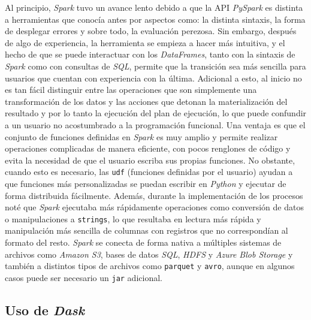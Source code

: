Al principio, \textit{Spark} tuvo un avance lento debido a que la API \textit{PySpark} es distinta a herramientas que conocía antes por aspectos como: la distinta sintaxis, la forma de desplegar errores y sobre todo, la evaluación perezosa. Sin embargo, después de algo de experiencia, la herramienta se empieza a hacer más intuitiva, y el hecho de que se puede interactuar con los \textit{DataFrames}, tanto con la sintaxis de \textit{Spark} como con consultas de \textit{SQL}, permite que la transición sea más sencilla para usuarios que cuentan con experiencia con la última. Adicional a esto, al inicio no es tan fácil distinguir entre las operaciones que son simplemente una transformación de los datos y las acciones que detonan la materialización del resultado y por lo tanto la ejecución del plan de ejecución, lo que puede confundir a un usuario no acostumbrado a la programación funcional. 
Una ventaja es que el conjunto de funciones definidas en \textit{Spark} es muy amplio y permite realizar operaciones complicadas de manera eficiente, con pocos renglones de código y evita la necesidad de que el usuario escriba sus propias funciones. No obstante, cuando esto es necesario, las \texttt{udf} (funciones definidas por el usuario) ayudan a que funciones más personalizadas se puedan escribir en \textit{Python} y ejecutar de forma distribuida fácilmente. Además, durante la implementación de los procesos noté que \textit{Spark} ejecutaba más rápidamente operaciones como conversión de datos o manipulaciones a \texttt{strings}, lo que resultaba en lectura más rápida y manipulación más sencilla de columnas con registros que no correspondían al formato del resto.
\textit{Spark} se conecta de forma nativa a múltiples sistemas de archivos como \textit{Amazon S3}, bases de datos \textit{SQL}, \textit{HDFS} y \textit{Azure Blob Storage} y también a distintos tipos de archivos como \texttt{parquet} y \texttt{avro}, aunque en algunos casos puede ser necesario un \texttt{jar} adicional.

\subsection{Uso de \textit{Dask}}

